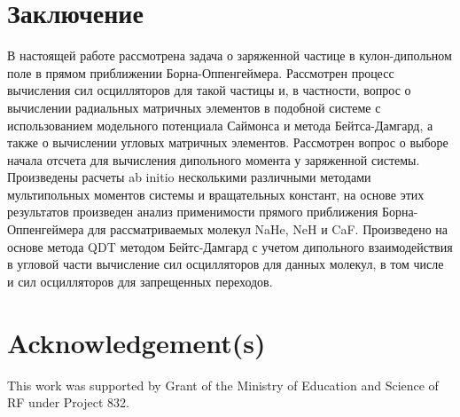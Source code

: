 \documentclass[]{interact}
\theoremstyle{plain}%
\theoremstyle{definition}
\theoremstyle{remark}
\begin{document}





\section{Заключение}
В настоящей работе рассмотрена задача о заряженной частице в кулон-дипольном поле в прямом приближении Борна-Оппенгеймера. Рассмотрен процесс вычисления сил осцилляторов для такой частицы и, в частности, вопрос о вычислении радиальных матричных элементов в подобной системе с использованием модельного потенциала Саймонса и метода Бейтса-Дамгард, а также о вычислении угловых матричных элементов. Рассмотрен вопрос о выборе начала отсчета для вычисления дипольного момента у заряженной системы.
Произведены расчеты ab initio несколькими различными методами мультипольных моментов системы и вращательных констант, на основе этих результатов произведен анализ применимости прямого приближения Борна-Оппенгеймера для рассматриваемых молекул NaHe, NeH и CaF. Произведено на основе метода QDT методом Бейтс-Дамгард с учетом дипольного взаимодействия в угловой части вычисление сил осцилляторов для данных молекул, в том числе и сил осцилляторов для запрещенных переходов.



\section*{Acknowledgement(s)}

This work was supported by Grant of the Ministry of Education and Science of RF under Project 832.





\begin{thebibliography}{99}




\end{thebibliography}
\end{document}
